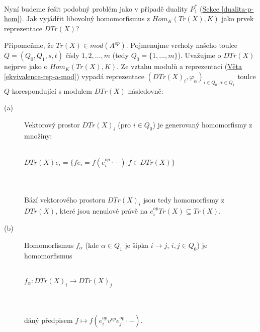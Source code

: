       \paragraph{ } Nyní budeme řešit podobný problém jako v případě duality $P_1^*$ 
      (\hyperref[dualita-p-hom]{Sekce \ref*{dualita-p-hom}}). 
      Jak vyjádřit libovolný homomorfismus z $Hom_K(Tr(X), K)$ jako prvek 
      reprezentace $DTr(X)$?
      
      Připomeňme, že $Tr(X)\in mod(A^{op})$. 
      Pojmenujme vrcholy našeho toulce $Q=(Q_0, Q_1,s,t)$ čísly $1,2,\ldots,m$ (tedy $Q_0=\{1,\ldots,m\}$).
      Uvažujme o $DTr(X)$ nejprve jako o $Hom_K(Tr(X), 
      K)$. Ze vztahu modulů a reprezentací 
      (\hyperref[ekvivalence-rep-a-mod]{Věta \ref*{ekvivalence-rep-a-mod}}) 
      vypadá reprezentace $(DTr(X)_i,\varphi_\alpha)_{i\in Q_0,\alpha\in Q_1}$ toulce $Q$ korespondující s modulem $DTr(X)$ následovně:
      \begin{description}
      \item[(a)] Vektorový prostor $DTr(X)_i$ (pro $i\in Q_0$) je generovaný homomorfismy z množiny: \\\\ 
        \centerline{$DTr(X)e_i=\{fe_i=f(e_i^{op}\cdot-)| f\in DTr(X)\}$} \\\\
        Bází vektorového prostoru $DTr(X)_i$  jsou tedy homomorfismy z $DTr(X)$, 
        které jsou nenulové právě na $e_i^{op}Tr(X)\subseteq Tr(X)$.
      \item[(b)] Homomorfismus $f_\alpha$ (kde $\alpha\in Q_1$ je šipka $i \rightarrow j$, $i,j\in Q_0$) 
      je homomorfismus \\\\
      \centerline{$f_\alpha:DTr(X)_i\rightarrow DTr(X)_j$}\\\\
      dáný předpisem $f \mapsto f(e_i^{op}v^{op}e_j^{op}\cdot-)$.
      \end{description}
      
      
       
      \quad\\
      
